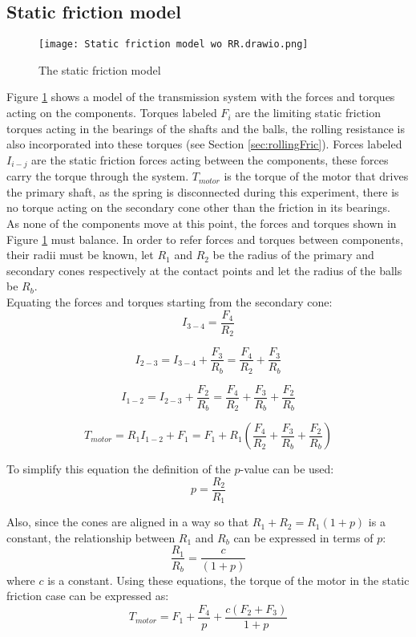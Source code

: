 \documentclass[12pt]{article}
\begin{document}
\subsection{Static friction model}

\begin{figure}[h]
    \centering
    \texttt{[image: Static friction model wo RR.drawio.png]}
    \caption{The static friction model}
    \label{fig:staticFricModel}
\end{figure}

Figure \ref{fig:staticFricModel} shows a model of the transmission system with the forces and torques acting on the components. Torques labeled $F_i$ are the limiting static friction torques acting in the bearings of the shafts and the balls, the rolling resistance is also incorporated into these torques (see Section \ref{sec:rollingFric}). Forces labeled $I_{i-j}$ are the static friction forces acting between the components, these forces carry the torque through the system. $T_{motor}$ is the torque of the motor that drives the primary shaft, as the spring is disconnected during this experiment, there is no torque acting on the secondary cone other than the friction in its bearings. \\

As none of the components move at this point, the forces and torques shown in Figure \ref{fig:staticFricModel} must balance. In order to refer forces and torques between components, their radii must be known, let $R_1$ and $R_2$ be the radius of the primary and secondary cones  respectively at the contact points and let the radius of the balls be $R_b.$\\

Equating the forces and torques starting from the secondary cone:\\

$$I_{3-4} = \frac{F_4}{R_2}$$

$$I_{2-3} = I_{3-4}  + \frac{F_3}{R_b} = \frac{F_4}{R_2} + \frac{F_3}{R_b}$$

$$I_{1-2} = I_{2-3} + \frac{F_2}{R_b} = \frac{F_4}{R_2} + \frac{F_3}{R_b}  + \frac{F_2}{R_b}$$

$$T_{motor} = R_1 I_{1-2} + F_1 = F_1 + R_1 \left(\frac{F_4}{R_2}  + \frac{F_3}{R_b}  + \frac{F_2}{R_b} \right) $$

To simplify this equation the definition of the $p$-value can be used:
$$p=\frac{R_2}{R_1}$$

Also, since the cones are aligned in a way so that $R_1+R_2 = R_1(1+p)$ is a constant, the relationship between $R_1$ and $R_b$ can be expressed in terms of $p$:
$$\frac{R_1}{R_b} = \frac{c}{(1+p)}$$
where $c$ is a constant.
Using these equations, the torque of the motor in the static friction case can be expressed as:
$$T_{motor} = F_1 + \frac{F_4}{p} + \frac{c(F_2+F_3)}{1+p}$$
\end{document}

